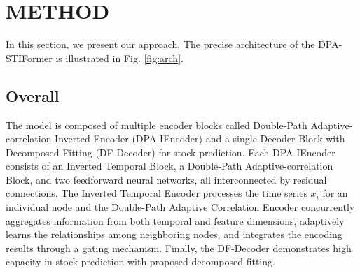 \section{METHOD}

In this section, we present our approach. The precise architecture of the DPA-STIFormer is illustrated in Fig. \ref{fig:arch}.
\subsection{Overall}
The model is composed of multiple encoder blocks called Double-Path Adaptive-correlation Inverted Encoder (DPA-IEncoder) and a single Decoder Block with Decomposed Fitting (DF-Decoder) for stock prediction. Each DPA-IEncoder consists of an Inverted Temporal Block, a Double-Path Adaptive-correlation Block, and two feedforward neural networks, all interconnected by residual connections. The Inverted Temporal Encoder processes the time series $x_i$ for an individual node and the Double-Path Adaptive Correlation Encoder concurrently aggregates information from both temporal and feature dimensions, adaptively learns the relationships among neighboring nodes, and integrates the encoding results through a gating mechanism. Finally, the DF-Decoder demonstrates high capacity in stock prediction with proposed decomposed fitting.

